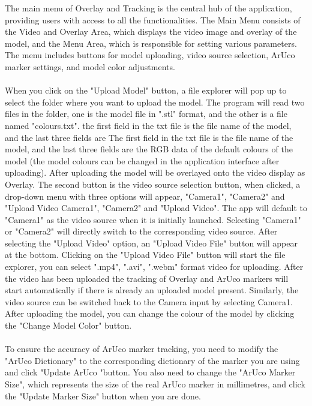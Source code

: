 \documentclass[12pt]{article}
\begin{document}
\begin{enumerate}
\begin{enumerate}
                        The main menu of Overlay and Tracking is the central hub of the application, providing users with access to all the functionalities.
                        The Main Menu consists of the Video and Overlay Area, which displays the video image and overlay of the model, and the Menu Area, which is responsible for setting various parameters.
                        The menu includes buttons for model uploading, video source selection, ArUco marker settings, and model color adjustments.
                        \\\\
                        When you click on the "Upload Model" button, a file explorer will pop up to select the folder where you want to upload the model. The program will read two files in the folder, one is the model file in ".stl" format, and the other is a file named "colours.txt". the first field in the txt file is the file name of the model, and the last three fields are The first field in the txt file is the file name of the model, and the last three fields are the RGB data of the default colours of the model (the model colours can be changed in the application interface after uploading). After uploading the model will be overlayed onto the video display as Overlay. The second button is the video source selection button, when clicked, a drop-down menu with three options will appear, "Camera1", "Camera2" and "Upload Video Camera1", "Camera2" and "Upload Video". The app will default to "Camera1" as the video source when it is initially launched. Selecting "Camera1" or "Camera2" will directly switch to the corresponding video source. After selecting the "Upload Video" option, an "Upload Video File" button will appear at the bottom. Clicking on the "Upload Video File" button will start the file explorer, you can select ".mp4", ".avi", ".webm" format video for uploading. After the video has been uploaded the tracking of Overlay and ArUco markers will start automatically if there is already an uploaded model present. Similarly, the video source can be switched back to the Camera input by selecting Camera1. After uploading the model, you can change the colour of the model by clicking the "Change Model Color" button.
                        \label{sec:upload}
                        \\\\
                        To ensure the accuracy of ArUco marker tracking, you need to modify the "ArUco Dictionary" to the corresponding dictionary of the marker you are using and click "Update ArUco "button. You also need to change the "ArUco Marker Size", which represents the size of the real ArUco marker in millimetres, and click the "Update Marker Size" button when you are done.


\end{enumerate}
\end{enumerate}
\end{document}
